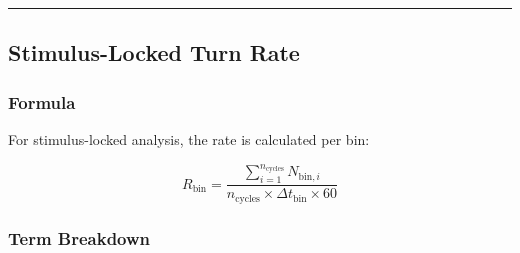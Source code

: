 \documentclass[
  11pt,
]{article}
\begin{document}
\begin{center}\rule{0.5\linewidth}{0.5pt}\end{center}

\hypertarget{stimulus-locked-turn-rate}{%
\subsection{Stimulus-Locked Turn Rate}\label{stimulus-locked-turn-rate}}

\hypertarget{formula-1}{%
\subsubsection{Formula}\label{formula-1}}

For stimulus-locked analysis, the rate is calculated per bin:

\[R_{\text{bin}} = \frac{\sum_{i=1}^{n_{\text{cycles}}} N_{\text{bin},i}}{n_{\text{cycles}} \times \Delta t_{\text{bin}} \times 60}\]

\hypertarget{term-breakdown-1}{%
\subsubsection{Term Breakdown}\label{term-breakdown-1}}
\end{document}
